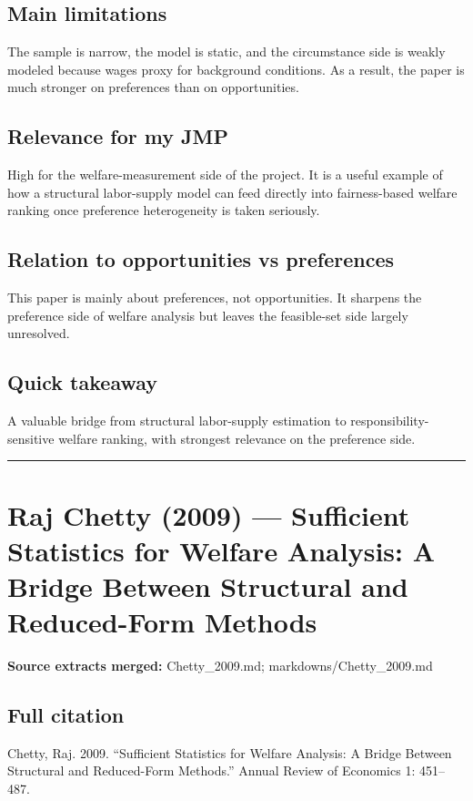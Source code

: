 \documentclass[11pt,a4paper]{article}
\begin{document}
\subsection*{Main limitations}
The sample is narrow, the model is static, and the circumstance side is weakly modeled because wages proxy for background conditions. As a result, the paper is much stronger on preferences than on opportunities.

\subsection*{Relevance for my JMP}
High for the welfare-measurement side of the project. It is a useful example of how a structural labor-supply model can feed directly into fairness-based welfare ranking once preference heterogeneity is taken seriously.

\subsection*{Relation to opportunities vs preferences}
This paper is mainly about preferences, not opportunities. It sharpens the preference side of welfare analysis but leaves the feasible-set side largely unresolved.

\subsection*{Quick takeaway}
A valuable bridge from structural labor-supply estimation to responsibility-sensitive welfare ranking, with strongest relevance on the preference side.


\medskip\hrule\medskip

\section*{Raj Chetty (2009) — Sufficient Statistics for Welfare Analysis: A Bridge Between Structural and Reduced-Form Methods}

\textbf{Source extracts merged:} Chetty\_2009.md; markdowns/Chetty\_2009.md

\subsection*{Full citation}
Chetty, Raj. 2009. “Sufficient Statistics for Welfare Analysis: A Bridge Between Structural and Reduced-Form Methods.” Annual Review of Economics 1: 451–487.
\end{document}
